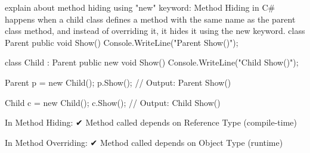  explain about method hiding using "new" keyword:
  Method Hiding in C# happens when a child class defines a method with the same name as the parent class method, and instead of overriding it, it hides it using the new keyword.
  class Parent
{
    public void Show()
    {
        Console.WriteLine("Parent Show()");
    }
}

class Child : Parent
{
    public new void Show()
    {
        Console.WriteLine("Child Show()");
    }
}

Parent p = new Child();
p.Show();   // Output: Parent Show()

Child c = new Child();
c.Show();   // Output: Child Show()

In Method Hiding:
✔ Method called depends on Reference Type (compile-time)

In Method Overriding:
✔ Method called depends on Object Type (runtime)
